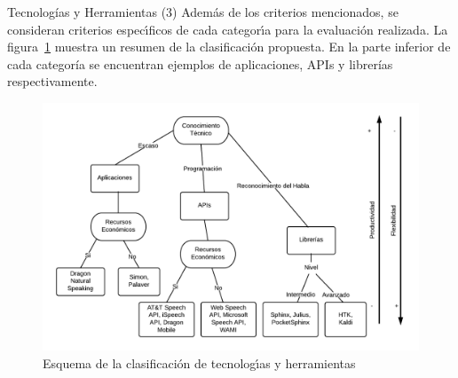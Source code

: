 \begin{frame}{Tecnolog\'ias y Herramientas (3)}
Además de los criterios mencionados, se consideran criterios espec{\'\i}ficos de cada categor{\'\i}a 
para la evaluaci\'on realizada.
La figura~\ref{figure:esquema-herramientas} muestra un resumen de la clasificaci\'on propuesta. En la parte 
inferior de cada categor\'ia se encuentran ejemplos de
aplicaciones, APIs y librer\'ias respectivamente. 

\begin{figure}[H]
\centering
\includegraphics[width=0.8\linewidth]{./graphics/esquema-herramientas.png}
\caption{Esquema de la clasificaci\'on de tecnolog{\'\i}as y herramientas}
\label{figure:esquema-herramientas}
\end{figure}
\end{frame}
